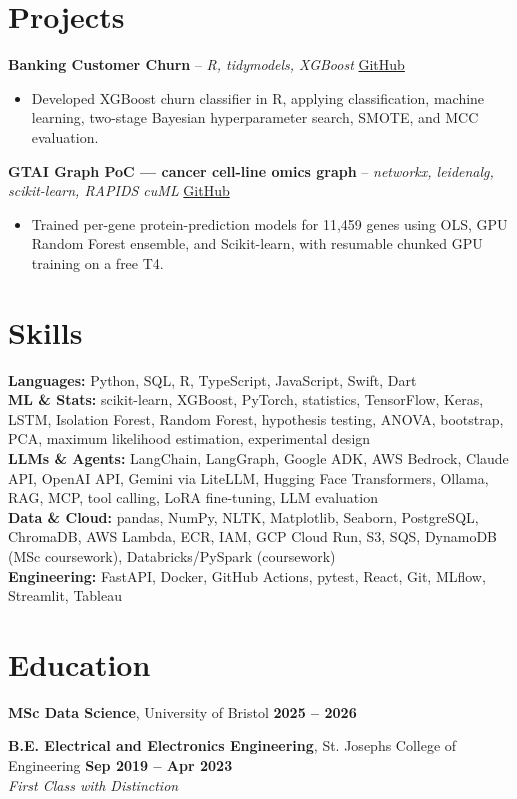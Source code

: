\documentclass[a4paper,10pt]{article}
\begin{document}
\section{Projects}
\noindent\textbf{Banking Customer Churn} -- \textit{R, tidymodels, XGBoost} \hfill \href{https://github.com/Thiruvel-AP/Banking-Customer-Churn-Prediction}{GitHub}
\begin{itemize}
  \item Developed XGBoost churn classifier in R, applying classification, machine learning, two-stage Bayesian hyperparameter search, SMOTE, and MCC evaluation.
\end{itemize}
\noindent\textbf{GTAI Graph PoC — cancer cell-line omics graph} -- \textit{networkx, leidenalg, scikit-learn, RAPIDS cuML} \hfill \href{https://github.com/Thiruvel-AP/GTAI-GraphPOC}{GitHub}
\begin{itemize}
  \item Trained per-gene protein-prediction models for 11,459 genes using OLS, GPU Random Forest ensemble, and Scikit-learn, with resumable chunked GPU training on a free T4.
\end{itemize}

\section{Skills}
\textbf{Languages:} Python, SQL, R, TypeScript, JavaScript, Swift, Dart\\
\textbf{ML \& Stats:} scikit-learn, XGBoost, PyTorch, statistics, TensorFlow, Keras, LSTM, Isolation Forest, Random Forest, hypothesis testing, ANOVA, bootstrap, PCA, maximum likelihood estimation, experimental design\\
\textbf{LLMs \& Agents:} LangChain, LangGraph, Google ADK, AWS Bedrock, Claude API, OpenAI API, Gemini via LiteLLM, Hugging Face Transformers, Ollama, RAG, MCP, tool calling, LoRA fine-tuning, LLM evaluation\\
\textbf{Data \& Cloud:} pandas, NumPy, NLTK, Matplotlib, Seaborn, PostgreSQL, ChromaDB, AWS Lambda, ECR, IAM, GCP Cloud Run, S3, SQS, DynamoDB (MSc coursework), Databricks/PySpark (coursework)\\
\textbf{Engineering:} FastAPI, Docker, GitHub Actions, pytest, React, Git, MLflow, Streamlit, Tableau

\section{Education}
\textbf{MSc Data Science}, University of Bristol \hfill \textbf{2025 – 2026}\par
\vspace{2pt}
\textbf{B.E. Electrical and Electronics Engineering}, St. Joseph\textquotesingle{}s College of Engineering \hfill \textbf{Sep 2019 – Apr 2023}\\ \textit{First Class with Distinction}\par
\end{document}
